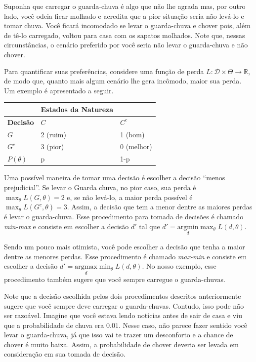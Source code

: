 \documentclass[
]{book}
\begin{document}
Suponha que carregar o guarda-chuva é algo que não lhe agrada mas, por outro lado, você odeia ficar molhado e acredita que a pior situação seria não levá-lo e tomar chuva. Você ficará incomodado se levar o guarda-chuva e chover pois, além de tê-lo carregado, voltou para casa com os sapatos molhados. Note que, nessas circunstâncias, o cenário preferido por você seria não levar o guarda-chuva e não chover.

Para quantificar suas preferências, considere uma função de perda \(L:\mathcal{D}\times\Theta\longrightarrow\mathbb{R}\), de modo que, quanto mais algum cenário lhe gera incômodo, maior sua perda. Um exemplo é apresentado a seguir.

\begin{longtable}[]{@{}lll@{}}
\toprule
& Estados da Natureza &\tabularnewline
\midrule
\endhead
\textbf{Decisão} & \(C\) & \(C^c\)\tabularnewline
\(G\) & 2 (ruim) & 1 (bom)\tabularnewline
\(G^c\) & 3 (pior) & 0 (melhor)\tabularnewline
\(P(\theta)\) & p & 1-p\tabularnewline
\bottomrule
\end{longtable}

Uma possível maneira de tomar uma decisão é escolher a decisão ``menos prejudicial''. Se levar o Guarda chuva, no pior caso, sua perda é \(\displaystyle \max_\theta L(G,\theta)=2\) e, se não levá-lo, a maior perda possível é \(\displaystyle \max_\theta L(G^c,\theta)=3\). Assim, a decisão que tem a menor dentre as maiores perdas é levar o guarda-chuva. Esse procedimento para tomada de decisões é chamado \emph{min-max} e consiste em escolher a decisão \(d'\) tal que \(d' = \displaystyle \underset{d}{\text{argmin}} \max_\theta L(d,\theta)\).

Sendo um pouco mais otimista, você pode escolher a decisão que tenha a maior dentre as menores perdas. Esse procedimento é chamado \emph{max-min} e consiste em escolher a decisão \(d' = \displaystyle \underset{d}{\text{argmax}} \min_\theta L(d,\theta)\). No nosso exemplo, esse procedimento também sugere que você sempre carregue o guarda-chuvas.

Note que a decisão escolhida pelos dois procedimentos descritos anteriormente sugere que você sempre deve carregar o guarda-chuvas. Contudo, isso pode não ser razoável. Imagine que você estava lendo notícias antes de sair de casa e viu que a probabilidade de chuva era \(0.01\). Nesse caso, não parece fazer sentido você levar o guarda-chuva, já que isso vai te trazer um desconforto e a chance de chover é muito baixa. Assim, a probabilidade de chover deveria ser levada em consideração em sua tomada de decisão.
\end{document}
